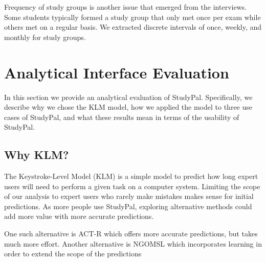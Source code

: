 \documentclass[conference]{IEEEtran}
\begin{document}
Frequency of study groups is another issue that emerged from the interviews.
Some students typically formed a study group that only met once per exam while others met on a regular basis.
We extracted discrete intervals of once, weekly, and monthly for study groups.





\section{Analytical Interface Evaluation}
 

 
In this section we provide an analytical evaluation of StudyPal.
Specifically, we describe why we chose the KLM model\cite{Card:KLM}, how we applied the model to three use cases of StudyPal, and what these results mean in terms of the usability of StudyPal.

\subsection{Why KLM?}
The Keystroke-Level Model (KLM) \cite{Card:KLM} is a simple model to predict how long expert users will need to perform a given task on a computer system.
Limiting the scope of our analysis to expert users who rarely make mistakes makes sense for initial predictions.
As more people use StudyPal, exploring alternative methods could add more value with more accurate predictions.

One such alternative is ACT-R\cite{Anderson:ACT-R} which offers more accurate predictions, but takes much more effort.
Another alternative is NGOMSL\cite{Kieras:NGOMSL} which incorporates learning in order to extend the scope of the predictions

\end{document}
